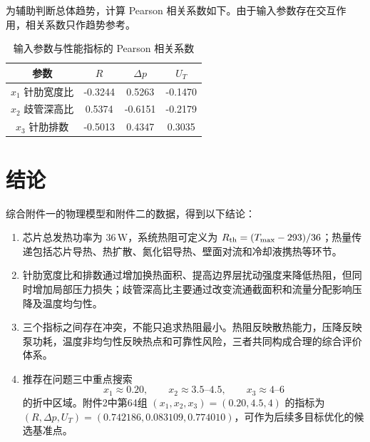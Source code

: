 \documentclass[UTF8,a4paper,12pt]{ctexart}
\begin{document}
为辅助判断总体趋势，计算 Pearson 相关系数如下。由于输入参数存在交互作用，相关系数只作趋势参考。
\begin{table}[H]
\centering
\caption{输入参数与性能指标的 Pearson 相关系数}
\begin{tabular}{c|ccc}
\toprule
参数 & $R$ & $\Delta p$ & $U_T$\\
\midrule
$x_1$ 针肋宽度比 & -0.3244 & 0.5263 & -0.1470\\
$x_2$ 歧管深高比 & 0.5374 & -0.6151 & -0.2179\\
$x_3$ 针肋排数 & -0.5013 & 0.4347 & 0.3035\\
\bottomrule
\end{tabular}
\end{table}

\section{结论}

综合附件一的物理模型和附件二的数据，得到以下结论：
\begin{enumerate}
  \item 芯片总发热功率为 $36\,\mathrm W$，系统热阻可定义为 $R_{\rm th}=(T_{\max}-293)/36$；热量传递包括芯片导热、热扩散、氮化铝导热、壁面对流和冷却液携热等环节。
  \item 针肋宽度比和排数通过增加换热面积、提高边界层扰动强度来降低热阻，但同时增加局部压力损失；歧管深高比主要通过改变流通截面积和流量分配影响压降及温度均匀性。
  \item 三个指标之间存在冲突，不能只追求热阻最小。热阻反映散热能力，压降反映泵功耗，温度非均匀性反映热点和可靠性风险，三者共同构成合理的综合评价体系。
  \item 推荐在问题三中重点搜索
  \[
  x_1\approx0.20,\qquad x_2\approx3.5\text{--}4.5,\qquad x_3\approx4\text{--}6
  \]
  的折中区域。附件2中第64组 $(x_1,x_2,x_3)=(0.20,4.5,4)$ 的指标为 $(R,\Delta p,U_T)=(0.742186,0.083109,0.774010)$，可作为后续多目标优化的候选基准点。
\end{enumerate}
\end{document}
